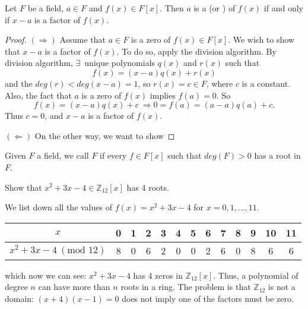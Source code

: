 \begin{theorem}
    Let $F$ be a field, $a \in F$ and $f(x) \in F[x]$. Then $a$ is a  (or ) of 
    $f(x)$ if and only if $x - a$ is a factor of $f(x)$.
\end{theorem}
\begin{proof}
    $(\Rightarrow)$ Assume that $a \in F$ is a zero of $f(x) \in F[x]$. We wish to show that 
    $x - a$ is a factor of $f(x)$. To do so, apply the division algorithm. By division algorithm, 
    $\exists \,$ unique polynomials $q(x)$ and $r(x)$ such that 
    \[
        f(x) = (x-a)q(x) + r(x)
    \]
    and the $deg(r) < deg(x-a) = 1$, so $r(x) = c \in F$, where $c$ is a constant. Also, the fact that 
    $a$ is a zero of $f(x)$ implies $f(a) = 0$. So 
    \[
        f(x) = (x-a)q(x) + c \> \Longrightarrow 0 = f(a) = (a-a)q(a) + c.
    \]
    Thus $c = 0$, and $x - a$ is a factor of $f(x)$.

    $(\Leftarrow)$ On the other way, we want to show 
\end{proof}

\begin{definition}
    Given $F$ a field, we call $F$  if every $f \in F[x]$ such that 
    $deg(F) > 0$ has a root in $F$.
\end{definition}

\begin{example}
    Show that $x^2 + 3x - 4 \in \mathbb{Z}_{12}[x]$ has 4 roots.
\end{example}
\begin{solution}
    We list down all the values of $f(x) = x^2 + 3x - 4$ for $x = 0, 1, \ldots, 11$.

    \begin{center}
        \begin{tabular}{|c|c|c|c|c|c|c|c|c|c|c|c|c|}
            \hline
            $x$ & 0 & 1 & 2 & 3 & 4 & 5 & 6 & 7 & 8 & 9 & 10 & 11\\
            \hline
            $x^2+3x-4\> (\text{mod } 12)$ & 8 & {\color{red} 0} & 6 & 2 & {\color{red} 0} & {\color{red} 0} & 
            2 & 6 & {\color{red} 0} & 8 & 6 & 6\\
            \hline
        \end{tabular}
    \end{center}

    which now we can see: $x^2 + 3x - 4$ has 4 zeros in $\mathbb{Z}_{12}[x]$. Thus, a polynomial of degree $n$ can have more than $n$ roots 
    in a ring. The problem is that $\mathbb{Z}_{12}$ is not a domain: $(x+4)(x-1) = 0$ 
    does not imply one of the factors must be zero.
\end{solution}

